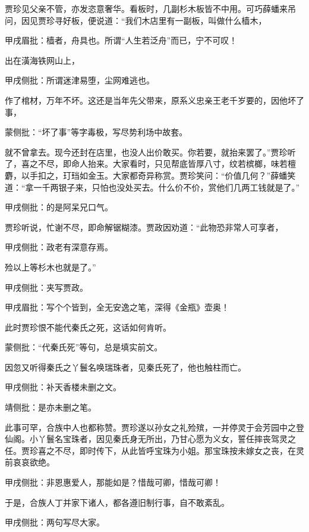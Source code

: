 \begin{parag}
    贾珍见父亲不管，亦发恣意奢华。看板时，几副杉木板皆不中用。可巧薛蟠来吊问，因见贾珍寻好板，便说道：“我们木店里有一副板，叫做什么樯木，\begin{note}甲戌眉批：樯者，舟具也。所谓“人生若泛舟”而已，宁不可叹！\end{note}出在潢海铁网山上，\begin{note}甲戌侧批：所谓迷津易堕，尘网难逃也。\end{note}作了棺材，万年不坏。这还是当年先父带来，原系义忠亲王老千岁要的，因他坏了事，\begin{note}蒙侧批：“坏了事”等字毒极，写尽势利场中故套。\end{note}就不曾拿去。现今还封在店里，也没人出价敢买。你若要，就抬来罢了。”贾珍听了，喜之不尽，即命人抬来。大家看时，只见帮底皆厚八寸，纹若槟榔，味若檀麝，以手扣之，玎珰如金玉。大家都奇异称赏。贾珍笑问：“价值几何？”薛蟠笑道：“拿一千两银子来，只怕也没处买去。什么价不价，赏他们几两工钱就是了。”\begin{note}甲戌侧批：的是阿呆兄口气。\end{note}贾珍听说，忙谢不尽，即命解锯糊漆。贾政因劝道：“此物恐非常人可享者，\begin{note}甲戌侧批：政老有深意存焉。\end{note}殓以上等杉木也就是了。”\begin{note}甲戌侧批：夹写贾政。\end{note}\begin{note}甲戌眉批：写个个皆到，全无安逸之笔，深得《金瓶》壶奥！\end{note}此时贾珍恨不能代秦氏之死，这话如何肯听。\begin{note}蒙侧批：“代秦氏死”等句，总是填实前文。\end{note}
\end{parag}


\begin{parag}
    因忽又听得秦氏之丫鬟名唤瑞珠者，见秦氏死了，他也触柱而亡。\begin{note}甲戌侧批：补天香楼未删之文。\end{note}\begin{note}靖侧批：是亦未删之笔。\end{note}此事可罕，合族中人也都称赞。贾珍遂以孙女之礼殓殡，一并停灵于会芳园中之登仙阁。小丫鬟名宝珠者，因见秦氏身无所出，乃甘心愿为义女，誓任摔丧驾灵之任。贾珍喜之不尽，即时传下，从此皆呼宝珠为小姐。那宝珠按未嫁女之丧，在灵前哀哀欲绝。\begin{note}甲戌侧批：非恩惠爱人，那能如是？惜哉可卿，惜哉可卿！\end{note}于是，合族人丁并家下诸人，都各遵旧制行事，自不敢紊乱。\begin{note}甲戌侧批：两句写尽大家。\end{note}
\end{parag}


